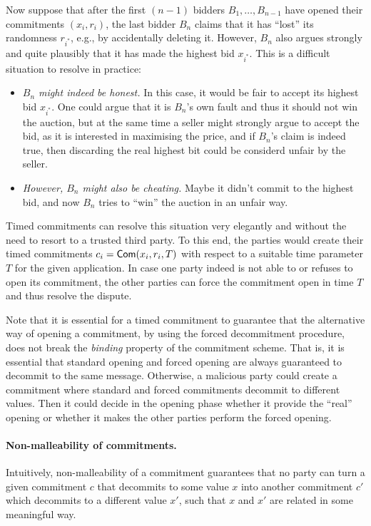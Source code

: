 Now suppose that after the first $(n-1)$ bidders $B_1, \ldots, B_{n-1}$ have opened their commitments $(x_i, r_i)$, the last bidder $B_n$ claims that it has ``lost'' its randomness $r_{i^*}$, e.g., by accidentally deleting it. However, $B_n$ also argues strongly and quite plausibly that it has made the highest bid $x_{i^*}$. This is a difficult situation to resolve in practice:
\begin{itemize}
	\item \emph{$B_n$ might indeed be honest.} In this case, it would be fair to accept its highest bid $x_{i^*}$. One could argue that it is $B_n$'s own fault and thus it should not win the auction, but at the same time a seller might strongly argue to accept the bid, as it is interested in maximising the price, and if $B_n$'s claim is indeed true, then discarding the real highest bit could be considerd unfair by the seller.
	\item \emph{However, $B_n$ might also be cheating.} Maybe it didn't commit to the highest bid, and now $B_n$ tries to ``win'' the auction in an unfair way.
\end{itemize}
Timed commitments can resolve this situation very elegantly and without the need to resort to a trusted third party. To this end, the parties would create their timed commitments $c_i = \mathsf{Com}(x_i,r_i, T)$ with respect to a suitable time parameter $T$ for the given application. In case one party indeed is not able to or refuses to open its commitment, the other parties can force the commitment open in time $T$ and thus resolve the dispute. 

Note that it is essential for a timed commitment to guarantee that the alternative way of opening a commitment, by using the forced decommitment procedure, does not break the \emph{binding} property of the commitment scheme. That is, it is essential that standard opening and forced opening are always guaranteed to decommit to the same message. Otherwise, a malicious party could create a commitment where standard and forced commitments decommit to different values. Then it could decide in the opening phase whether it provide the ``real'' opening or whether it makes the other parties perform the forced opening.


\paragraph{Non-malleability of commitments.}
Intuitively, non-malleability of a commitment guarantees that no party can turn a given commitment $c$ that decommits to some value $x$ into another commitment $c'$ which decommits to a different value $x'$, such that $x$ and $x'$ are related in some meaningful way.

